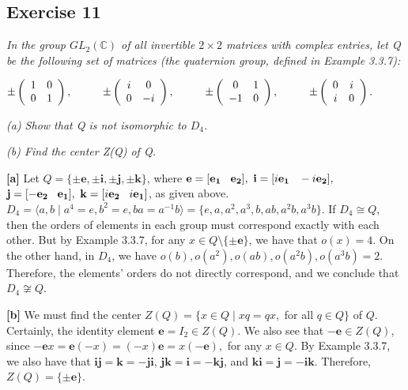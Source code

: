\subsection*{Exercise 11}
\textit{In the group $GL_2(\mathbb{C})$ of all invertible $2 \times 2$ matrices with complex entries, let Q be the following set of matrices (the quaternion group, defined in Example 3.3.7):}

$\pm\left(\begin{array}{cc}
1 & 0 \\ 0 & 1 \\ \end{array}\right), \hspace{10 mm}
\pm\left(\begin{array}{cc}
i & 0 \\ 0 & -i \\ \end{array}\right), \hspace{10 mm}
\pm\left(\begin{array}{cc}
0 & 1 \\ -1 & 0 \\ \end{array}\right), \hspace{10 mm}
\pm\left(\begin{array}{cc}
0 & i \\ i & 0 \\ \end{array}\right). \hspace{10 mm}$

\textit{(a) Show that Q is not isomorphic to $D_4$.}

\textit{(b) Find the center Z(Q) of Q.}

\vspace{5 mm}
\textbf{[a]} Let $Q = \{\pm \mathbf{e}, \pm \mathbf{i}, \pm \mathbf{j}, \pm \mathbf{k}\}$, where $\mathbf{e} = [\mathbf{e_1} \hspace{3 mm} \mathbf{e_2}],$ $\mathbf{i} = [i\mathbf{e_1} \hspace{3 mm} -i\mathbf{e_2}],$ $\mathbf{j} = [-\mathbf{e_2} \hspace{3 mm} \mathbf{e_1}],$ $\mathbf{k} = [i\mathbf{e_2} \hspace{3 mm} i\mathbf{e_1}]$, as given above. $D_4 = \langle a,b \mid a^4 = e, b^2 = e, ba = a^{-1}b\rangle = \{e,a,a^2,a^3,b,ab,a^2b,a^3b\}$. If $D_4 \cong Q$, then the orders of elements in each group must correspond exactly with each other. But by Example 3.3.7, for any $x \in Q\setminus\{\pm\mathbf{e}\}$, we have that $o(x) = 4$. On the other hand, in $D_4$, we have $o(b), o(a^2), o(ab), o(a^2b), o(a^3b) = 2$. Therefore, the elements' orders do not directly correspond, and we conclude that $D_4 \not\cong Q$.

\vspace{5 mm}
\textbf{[b]} We must find the center $Z(Q) = \{x \in Q \mid xq = qx,$ for all $q \in Q\}$ of $Q$. Certainly, the identity element $\mathbf{e} = I_2 \in Z(Q)$. We also see that $\mathbf{-e} \in Z(Q)$, since $\mathbf{-e}x = \mathbf{e}(-x) = (-x)\mathbf{e} = x(\mathbf{-e}),$ for any $x \in Q$. By Example 3.3.7, we also have that $\mathbf{ij = k = -ji}$, $\mathbf{jk = i = -kj}$, and $\mathbf{ki = j = -ik}$. Therefore, $Z(Q) = \{\pm\mathbf{e}\}$.